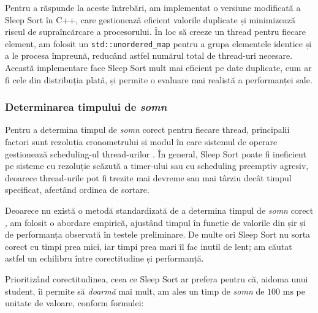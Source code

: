 \documentclass[9pt,a4paper,twocolumn,twoside]{rho-class/rho}
\begin{document}
    \begin{code}
        \inputminted[style=friendly]{cpp}{cod_sursa/sleepsort.cpp}
        \caption{Implementarea Sleep Sort în C++.}
        \label{lst:sleepsort}
    \end{code}

Pentru a răspunde la aceste întrebări, am implementat o versiune 
modificată a Sleep Sort în C++, care gestionează eficient valorile 
duplicate și minimizează riscul de supraîncărcare a procesorului. 
În loc să creeze un thread pentru fiecare element, am folosit un 
\texttt{std::unordered\_map} \cite{cppreference_map} pentru a grupa 
elementele identice și a le procesa împreună, reducând astfel numărul 
total de thread-uri necesare. Această implementare face Sleep Sort 
mult mai eficient pe date duplicate, cum ar fi cele din distribuția 
plată, și permite o evaluare mai realistă a performanței sale.

\subsubsection{Determinarea timpului de \textit{somn}}

\par Pentru a determina timpul de \textit{somn} corect pentru fiecare 
thread, principalii factori sunt rezoluția cronometrului 
\cite{microsoft_timers} și modul în care sistemul de operare 
gestionează scheduling-ul thread-urilor \cite{tanenbaum2014modern}. 
În general, Sleep 
Sort poate fi ineficient pe sisteme cu rezoluție 
scăzută a timer-ului sau cu scheduling preemptiv agresiv, deoarece 
thread-urile pot fi trezite mai devreme sau mai târziu decât timpul 
specificat, afectând ordinea de sortare.

\par Deoarece nu există o metodă standardizată de a determina timpul 
de \textit{somn} corect \cite{devto_sleepsort}, am folosit o abordare 
empirică, ajustând timpul în funcție de valorile din șir și de 
performanța observată în testele preliminare. De multe ori Sleep Sort 
nu sorta corect cu timpi prea mici, iar timpi prea mari îl fac 
inutil de lent; am căutat astfel un echilibru între corectitudine 
și performanță.

\par Prioritizând corectitudinea, ceea ce Sleep Sort ar prefera pentru că, aidoma unui student, îi permite să \textit{doarmă} mai mult, am ales un timp de \textit{somn} 
de $100\text{ ms}$ pe unitate de valoare, conform formulei:
\end{document}
